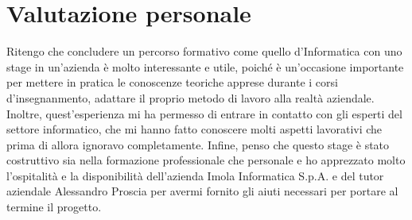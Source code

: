 
\section{Valutazione personale}\label{sec:valutazione-personale}
Ritengo che concludere un percorso formativo come quello d'Informatica con uno stage in un'azienda è molto interessante e utile, poiché è un'occasione importante per mettere in pratica le conoscenze teoriche apprese durante i corsi d'insegnanmento, adattare il proprio metodo di lavoro alla realtà aziendale.\\
Inoltre, quest'esperienza mi ha permesso di entrare in contatto con gli esperti del settore informatico, che mi hanno fatto conoscere molti aspetti lavorativi che prima di allora ignoravo completamente.
Infine, penso che questo stage è stato costruttivo sia nella formazione professionale che personale e ho apprezzato molto l'ospitalità e la disponibilità dell'azienda Imola Informatica S.p.A. e del tutor aziendale Alessandro Proscia per avermi fornito gli aiuti necessari per portare al termine il progetto.
